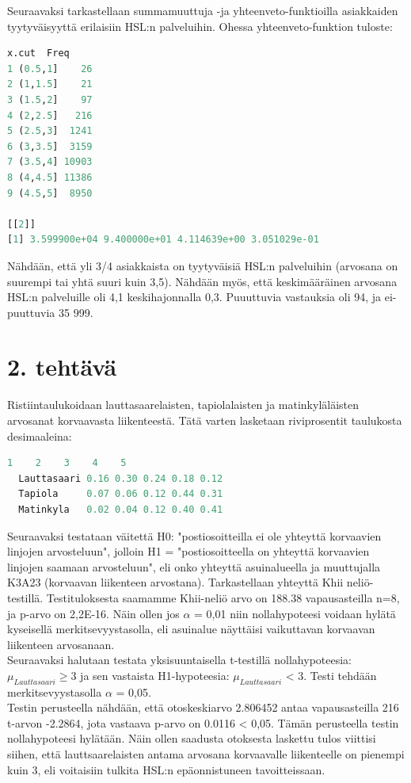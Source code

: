 \documentclass[a4paper]{article}
\begin{document}
Seuraavaksi tarkastellaan summamuuttuja -ja yhteenveto-funktioilla asiakkaiden tyytyväisyyttä erilaisiin HSL:n palveluihin. Ohessa yhteenveto-funktion tuloste:
\begin{lstlisting}[language=R]
    x.cut  Freq
1 (0.5,1]    26
2 (1,1.5]    21
3 (1.5,2]    97
4 (2,2.5]   216
5 (2.5,3]  1241
6 (3,3.5]  3159
7 (3.5,4] 10903
8 (4,4.5] 11386
9 (4.5,5]  8950

[[2]]
[1] 3.599900e+04 9.400000e+01 4.114639e+00 3.051029e-01
\end{lstlisting}
Nähdään, että yli 3/4 asiakkaista on tyytyväisiä HSL:n palveluihin (arvosana on suurempi tai yhtä suuri kuin 3,5). Nähdään myös, että keskimääräinen arvosana HSL:n palveluille oli 4,1 keskihajonnalla 0,3. Puuuttuvia vastauksia oli 94, ja ei-puuttuvia 35 999. 
\section*{2. tehtävä}
Ristiintaulukoidaan lauttasaarelaisten, tapiolalaisten ja matinkyläläisten arvosanat korvaavasta liikenteestä. Tätä varten lasketaan riviprosentit taulukosta desimaaleina: \\
\begin{lstlisting}[language=R]
               1    2    3    4    5
  Lauttasaari 0.16 0.30 0.24 0.18 0.12
  Tapiola     0.07 0.06 0.12 0.44 0.31
  Matinkyla   0.02 0.04 0.12 0.40 0.41
\end{lstlisting}
Seuraavaksi testataan väitettä H0: "postiosoitteilla ei ole yhteyttä korvaavien linjojen arvosteluun", jolloin H1 = "postiosoitteella on yhteyttä korvaavien linjojen saamaan arvosteluun",  eli onko yhteyttä asuinalueella ja muuttujalla K3A23 (korvaavan liikenteen arvostana). Tarkastellaan yhteyttä Khii neliö-testillä. Testituloksesta saamamme Khii-neliö arvo on 188.38 vapausasteilla n=8, ja p-arvo on 2,2E-16. Näin ollen jos \(\alpha\) = 0,01 niin nollahypoteesi voidaan hylätä kyseisellä merkitsevyystasolla, eli asuinalue näyttäisi vaikuttavan korvaavan liikenteen arvosanaan. \\

Seuraavaksi halutaan testata yksisuuntaisella t-testillä nollahypoteesia: \(\mu_{Lauttasaari} \geq 3\) ja sen vastaista H1-hypoteesia: \(\mu_{Lauttasaari}\) < 3. Testi tehdään merkitsevyystasolla  \(\alpha\) = 0,05.  \\
Testin perusteella nähdään, että otoskeskiarvo 2.806452 antaa vapausasteilla 216 t-arvon -2.2864, jota vastaava p-arvo on 0.0116 < 0,05. Tämän perusteella testin nollahypoteesi hylätään. Näin ollen saadusta otoksesta laskettu tulos viittisi siihen, että lauttsaarelaisten antama arvosana korvaavalle liikenteelle on pienempi kuin 3, eli voitaisiin tulkita HSL:n epäonnistuneen tavoitteissaan. \\
\end{document}
